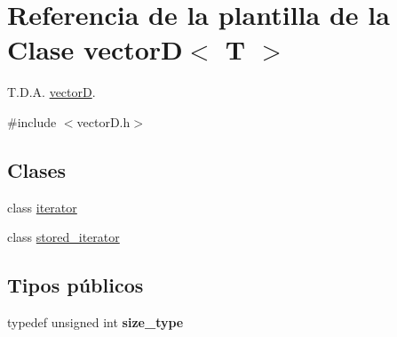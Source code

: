 \hypertarget{classvectorD}{}\section{Referencia de la plantilla de la Clase vectorD$<$ T $>$}
\label{classvectorD}


T.\+D.\+A. \hyperlink{classvectorD}{vectorD}.  




{\ttfamily \#include $<$vector\+D.\+h$>$}

\subsection*{Clases}
\begin{DoxyCompactItemize}
\item 
class \hyperlink{classvectorD_1_1iterator}{iterator}
\item 
class \hyperlink{classvectorD_1_1stored__iterator}{stored\+\_\+iterator}
\end{DoxyCompactItemize}
\subsection*{Tipos públicos}
\begin{DoxyCompactItemize}
\item 
\mbox{\label{classvectorD_aa812b4ed4f68c9e2ea7422d1187247e8}} 
typedef unsigned int {\bfseries size\+\_\+type}
\end{DoxyCompactItemize}
